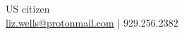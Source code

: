 \documentclass[a4paper]{deedy-resume-openfont} %
\begin{document}

\lastupdated %

{
US citizen \\
\href{mailto:liz.wells@protonmail.com}{liz.wells@protonmail.com} | 929.256.2382
}

\end{document}
